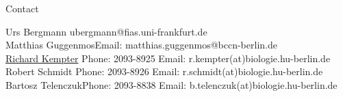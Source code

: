 \documentclass[12pt, a4]{article}
\begin{document}
\vfill
\centerline{\CAP Contact}
\CAP

Urs Bergmann \hfill ubergmann@fias.uni-frankfurt.de \\ 
Matthias Guggenmos\hfill Email: matthias.guggenmos@bccn-berlin.de\\
\underline{Richard Kempter} \hfill Phone: 2093-8925 \hfill
Email: r.kempter(at)biologie.hu-berlin.de \\
Robert Schmidt \hfill Phone: 2093-8926 \hfill
Email: r.schmidt(at)biologie.hu-berlin.de \\
Bartosz Telenczuk\hfill Phone: 2093-8838 \hfill
Email: b.telenczuk(at)biologie.hu-berlin.de \\
\end{document}
